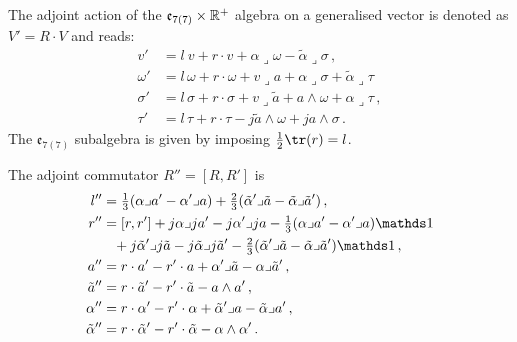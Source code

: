 \documentclass[debug]{phd}
\begin{document}
			The adjoint action of the $\mathfrak{e}_{7(7)}\times \mathbb{R}^+$ algebra on a generalised vector is denoted as $V' = R \cdot V$ and reads:
					\begin{equation}\label{Mth_adjoint_act}
						\begin{split}
							v' &= l\ v + r \cdot v + \alpha \lrcorner \omega - \tilde{\alpha} \lrcorner \sigma \, ,\\
							\omega' &= l \, \omega + r \cdot \omega +v \lrcorner a+ \alpha \lrcorner \sigma + \tilde{\alpha} \lrcorner \tau \, \\
							\sigma' &= l \,\sigma + r \cdot \sigma +v \lrcorner \tilde a + a \wedge \omega+ \alpha \lrcorner \tau \, , \\
							\tau'&= l\, \tau+ r \cdot \tau - j \tilde a \wedge \omega+ j a \wedge \sigma \, .
						\end{split}
					\end{equation}
			The $\mathfrak{e}_{7(7)}$ subalgebra is given by imposing $ \frac{1}{2} \tr(r) = l$.
			
			The adjoint commutator $R''= [R , R']$ is
					\begin{equation}\label{comm_Mth_adj}
						\begin{split}
							l'' &= \tfrac{1}{3} (\alpha \lrcorner a' - \alpha' \lrcorner a) + \tfrac{2}{3} (\tilde \alpha' \lrcorner \tilde a - \tilde \alpha \lrcorner \tilde a') \, , \\
							r'' &= [ r, r'] + j \alpha \lrcorner j a' - j \alpha' \lrcorner j a - \tfrac{1}{3} (\alpha \lrcorner a' - \alpha' \lrcorner a) \id \\
								& \phantom{=} + j \tilde \alpha' \lrcorner j \tilde a - j \tilde \alpha \lrcorner j \tilde a' - \tfrac{2}{3} (\tilde \alpha' \lrcorner \tilde a - \tilde \alpha \lrcorner \tilde a')\id \, ,\\
							a'' &= r \cdot a' - r' \cdot a + \alpha' \lrcorner \tilde a - \alpha \lrcorner \tilde a' \, , \\
							\tilde a'' &= r \cdot \tilde a' - r' \cdot \tilde a - a \wedge a' \, , \\
							\alpha'' &= r \cdot \alpha' - r' \cdot \alpha +\tilde \alpha' \lrcorner a - \tilde \alpha \lrcorner a' \, , \\
							\tilde \alpha'' &= r \cdot \tilde \alpha' - r' \cdot \tilde \alpha - \alpha \wedge \alpha' \, .
						\end{split}
					\end{equation}
\end{document}
